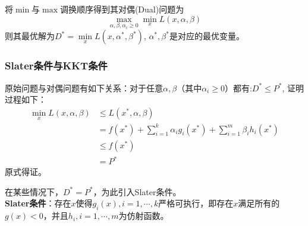 \documentclass[supercite]{upcthesis}
\begin{document}
将$\min$与$\max$调换顺序得到其对偶(Dual)问题为
\begin{equation}
\max\limits_{\alpha,\beta,\alpha_i\geq0}\min\limits_{x}L(x,\alpha,\beta)
\end{equation}
则其最优解为$D^{*}=\min\limits_{x}L(x,\alpha^{*},\beta^{*})$, $\alpha^{*},\beta^{*}$是对应的最优变量。
\subsubsection{Slater条件与KKT条件}
原始问题与对偶问题有如下关系：对于任意$\alpha,\beta$（其中$\alpha_{i} \geq 0$）都有:$D^{*} \leq P^{*}$, 证明过程如下：
\begin{equation}
\begin{aligned}
\min\limits_{x}L(x,\alpha,\beta)& \leq L(x^{*},\alpha,\beta)\\
&=f(x^{*})+\sum_{i=1}^{k}\alpha_{i}g_{i}(x^{*})+\sum_{i=1}^{m}\beta_{i}h_{i}(x^{*})\\
& \leq f(x^{*})\\
&=P^{*}
\end{aligned}
\end{equation}
原式得证。

在某些情况下，$D^{*}=P^{*}$，为此引入Slater条件。\\
\textbf{Slater条件}：存在$x$使得$g_i(x),i=1,\cdots,k$严格可执行，即存在$x$满足所有的$g(x)<0$，并且$h_i,i=1,\cdots,m$为仿射函数。
\end{document}
